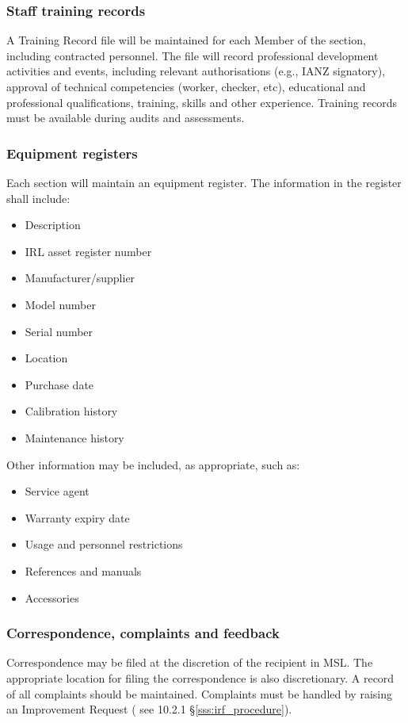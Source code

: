 \subsubsection{Staff training records}
\label{sss:training_records}
A Training Record file will be maintained for each Member of the section, including contracted personnel. The file will record professional development activities and events, including relevant authorisations (e.g., IANZ signatory), approval of technical competencies (worker, checker, etc), educational and professional qualifications, training, skills and other experience. 
Training records must be available during audits and assessments. 

\subsubsection{Equipment registers}
\label{sss:equipment_register}
Each section will maintain an equipment register. The information in the register shall include: 
\begin{itemize}
\item Description 
\item IRL asset register number 
\item Manufacturer/supplier 
\item Model number 
\item Serial number 
\item Location
\item Purchase date 
\item Calibration history 
\item Maintenance history
\end{itemize}
Other information may be included, as appropriate, such as:
\begin{itemize}\item Service agent 
\item Warranty expiry date 
\item Usage and personnel restrictions
\item References and manuals
\item Accessories
\end{itemize}

\subsubsection{Correspondence, complaints and feedback}
Correspondence may be filed at the discretion of the recipient in MSL. The appropriate location for filing the correspondence is also discretionary. 
A record of all complaints should be maintained. Complaints must be handled by raising an Improvement Request ( see 10.2.1 \S\ref{sss:irf_procedure}).

